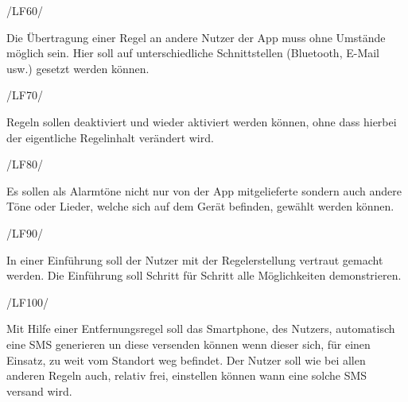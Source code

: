 \begin{minipage}{3cm}
/LF60/
\end{minipage}
\begin{minipage}{13cm}
Die \"Ubertragung einer Regel an andere Nutzer der App muss ohne Umst\"ande m\"oglich sein. Hier soll auf unterschiedliche Schnittstellen (Bluetooth, E-Mail usw.) gesetzt werden k\"onnen. \\
\end{minipage}
\begin{minipage}{3cm}
/LF70/
\end{minipage}
\begin{minipage}{13cm}
Regeln sollen deaktiviert und wieder aktiviert werden k\"onnen, ohne dass hierbei der eigentliche Regelinhalt ver\"andert wird.
\end{minipage}
\begin{minipage}{3cm}
/LF80/
\end{minipage}
\begin{minipage}{13cm}
Es sollen als Alarmt\"one nicht nur von der App mitgelieferte sondern auch andere T\"one oder Lieder, welche sich auf dem Ger\"at befinden, gew\"ahlt werden k\"onnen.\\
\end{minipage}
\begin{minipage}{3cm}
/LF90/
\end{minipage}
\begin{minipage}{13cm}
In einer Einf\"uhrung soll der Nutzer mit der Regelerstellung vertraut gemacht werden. Die Einf\"uhrung soll Schritt f\"ur Schritt alle M\"oglichkeiten demonstrieren.\\
\end{minipage}
\begin{minipage}{3cm}
/LF100/
\end{minipage}
\begin{minipage}{13cm}
Mit Hilfe einer Entfernungsregel soll das Smartphone, des Nutzers, automatisch eine SMS generieren un diese versenden k\"onnen wenn dieser sich, f\"ur einen Einsatz, zu weit vom Standort weg befindet.
Der Nutzer soll wie bei allen anderen Regeln auch, relativ frei, einstellen k\"onnen wann eine solche SMS versand wird.\\
\end{minipage}



